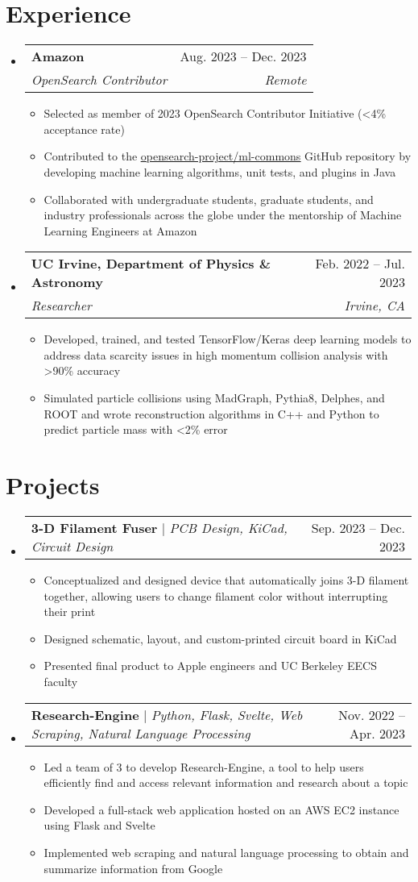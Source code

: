 \documentclass[letterpaper,11pt]{article}
\makeatletter
\newcommand{\resumeItem}[1]{
  \item\small{
    {#1 \vspace{-2pt}}
  }
}
\newcommand{\resumeSubheading}[4]{
  \vspace{-2pt}\item
    \begin{tabular*}{0.97\textwidth}[t]{l@{\extracolsep{\fill}}r}
      \textbf{#1} & #2 \\
      \textit{\small#3} & \textit{\small #4} \\
    \end{tabular*}\vspace{-7pt}
}
\newcommand{\resumeProjectHeading}[2]{
    \item
    \begin{tabular*}{0.97\textwidth}{l@{\extracolsep{\fill}}r}
      \small#1 & #2 \\
    \end{tabular*}\vspace{-7pt}
}
\newcommand{\resumeSubHeadingListStart}{\begin{itemize}[leftmargin=0.15in, label={}]}
\newcommand{\resumeSubHeadingListEnd}{\end{itemize}}
\newcommand{\resumeItemListStart}{\begin{itemize}}
\newcommand{\resumeItemListEnd}{\end{itemize}\vspace{-5pt}}
\makeatother
\begin{document}
\section{Experience}
  \resumeSubHeadingListStart
    \resumeSubheading
      {Amazon}{Aug. 2023 -- Dec. 2023}
      {OpenSearch Contributor}{Remote}
      \resumeItemListStart
        \resumeItem{Selected as member of 2023 OpenSearch Contributor Initiative (\textless 4\% acceptance rate)}
        \resumeItem{Contributed to the \href{https://github.com/opensearch-project/ml-commons/}{\underline{opensearch-project/ml-commons}} GitHub repository by developing machine learning algorithms, unit tests, and plugins in Java}
        \resumeItem{Collaborated with undergraduate students, graduate students, and industry professionals across the globe under the mentorship of Machine Learning Engineers at Amazon}
      \resumeItemListEnd
  \resumeSubHeadingListEnd

  \resumeSubHeadingListStart
    \resumeSubheading
      {UC Irvine, Department of Physics \& Astronomy}{Feb. 2022 -- Jul. 2023}
      {Researcher}{Irvine, CA}
      \resumeItemListStart
        \resumeItem{Developed, trained, and tested TensorFlow/Keras deep learning models to address data scarcity issues in high momentum collision analysis with \textgreater 90\% accuracy}
        \resumeItem{Simulated particle collisions using MadGraph, Pythia8, Delphes, and ROOT and wrote reconstruction algorithms in C++ and Python to predict particle mass with \textless 2\% error}
      \resumeItemListEnd
  \resumeSubHeadingListEnd

\section{Projects}
  \resumeSubHeadingListStart
    \resumeProjectHeading
      {\textbf{3-D Filament Fuser} $|$ \emph{PCB Design, KiCad, Circuit Design}}{Sep. 2023 -- Dec. 2023}
      \resumeItemListStart
        \resumeItem{Conceptualized and designed device that automatically joins 3-D filament together, allowing users to change filament color without interrupting their print}
        \resumeItem{Designed schematic, layout, and custom-printed circuit board in KiCad}
        \resumeItem{Presented final product to Apple engineers and UC Berkeley EECS faculty}
      \resumeItemListEnd
  \resumeSubHeadingListEnd

  \resumeSubHeadingListStart
    \resumeProjectHeading
      {\textbf{Research-Engine} $|$ \emph{Python, Flask, Svelte, Web Scraping, Natural Language Processing}}{Nov. 2022 -- Apr. 2023}
      \resumeItemListStart
        \resumeItem{Led a team of 3 to develop Research-Engine, a tool to help users efficiently find and access relevant information and research about a topic}
        \resumeItem{Developed a full-stack web application hosted on an AWS EC2 instance using Flask and Svelte}
        \resumeItem{Implemented web scraping and natural language processing to obtain and summarize information from Google}
      \resumeItemListEnd
  \resumeSubHeadingListEnd
\end{document}
